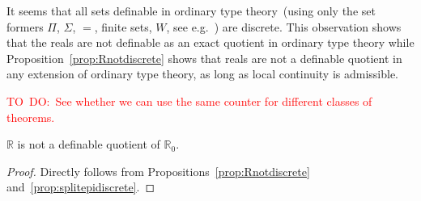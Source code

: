 \documentclass[envcountsame]{llncs}
\newcommand{\todo}[1]{\textcolor{red}{TO~DO:~#1}}
\newcommand{\R}{\mathbb{R}}
\begin{document}
It seems that all sets definable in ordinary type theory~(using only the set formers $\Pi$, $\Sigma$, $=$, finite sets, $W$, see e.g.~\cite{nordstrom1990programming}) are discrete. This observation shows that the reals are not  definable as an exact quotient in ordinary type theory while Proposition~\ref{prop:Rnotdiscrete} shows that reals are not a definable  quotient in any extension of ordinary type theory, as long as local continuity is admissible.

\todo{See whether we can use the same counter for different classes of theorems.}

\begin{corollary}
$\R$ is not a definable quotient of $\R_0$.
\end{corollary}
\begin{proof}
Directly follows from Propositions~\ref{prop:Rnotdiscrete} and~\ref{prop:splitepidiscrete}.
\end{proof}



\end{document}

